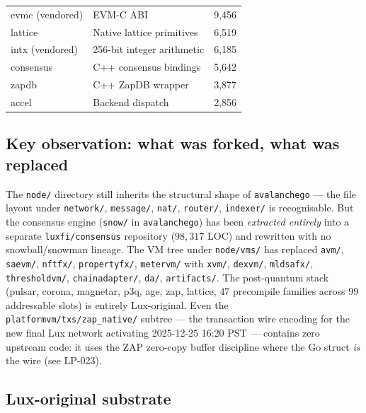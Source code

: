 \documentclass[11pt,a4paper]{article}
\begin{document}
\begin{table}[h]
\begin{tabular}{l l r}
evmc (vendored)            & EVM-C ABI                                 &   9{,}456 \\
lattice                    & Native lattice primitives                 &   6{,}519 \\
intx (vendored)            & 256-bit integer arithmetic                &   6{,}185 \\
consensus                  & C++ consensus bindings                    &   5{,}642 \\
zapdb                      & C++ ZapDB wrapper                         &   3{,}877 \\
accel                      & Backend dispatch                          &   2{,}856 \\
\bottomrule
\end{tabular}
\end{table}

\subsection{Key observation: what was forked, what was replaced}

The \texttt{node/} directory still inherits the structural shape of
\texttt{avalanchego} --- the file layout under \texttt{network/},
\texttt{message/}, \texttt{nat/}, \texttt{router/}, \texttt{indexer/} is
recognisable. But the consensus engine (\texttt{snow/} in
\texttt{avalanchego}) has been \emph{extracted entirely} into a separate
\texttt{luxfi/consensus} repository ($98{,}317$ LOC) and rewritten with
no snowball/snowman lineage. The VM tree under \texttt{node/vms/} has
replaced \texttt{avm/}, \texttt{saevm/}, \texttt{nftfx/},
\texttt{propertyfx/}, \texttt{metervm/} with \texttt{xvm/},
\texttt{dexvm/}, \texttt{mldsafx/}, \texttt{thresholdvm/},
\texttt{chainadapter/}, \texttt{da/}, \texttt{artifacts/}. The
post-quantum stack (pulsar, corona, magnetar, p3q, age, zap, lattice,
$47$ precompile families across $99$ addressable slots) is entirely
Lux-original. Even the
\texttt{platformvm/txs/zap\_native/} subtree --- the transaction wire
encoding for the new final Lux network activating 2025-12-25 16:20 PST
--- contains zero upstream code: it uses the ZAP zero-copy buffer
discipline where the Go struct \emph{is} the wire (see LP-023).

\subsection{Lux-original substrate}
\end{document}
